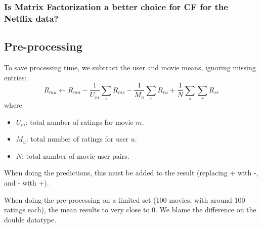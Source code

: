 \subsubsection{Is Matrix Factorization a better choice for CF for the Netflix data?}


\subsection{Pre-processing}
To save processing time, we subtract the user and movie means, ignoring missing entries:
\[
    R_{mu} \gets R_{mu} - \frac{1}{U_m}\sum_{s}{R_{ms}} - \frac{1}{M_u}\sum_{r}{R_{ru}} + \frac{1}{N}\sum_{s}\sum_{r}{R_{sr}}
\]
where
\begin{itemize}
    \item $U_m$: total number of ratings for movie $m$.
    \item $M_u$: total number of ratings for user $u$.
    \item $N$: total number of movie-user pairs.
\end{itemize}
%
When doing the predictions, this must be added to the result (replacing + with -, and - with +).

When doing the pre-processing on a limited set (100 movies, with around 100 ratings each), the mean results to very close to 0. We blame the difference on the double datatype.